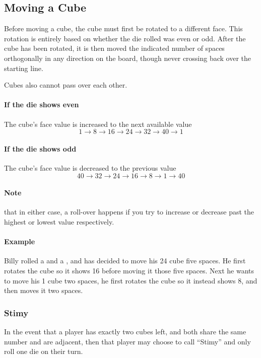 \subsection{Moving a Cube}
Before moving a cube, the cube must first be rotated to a different face.
This rotation is entirely based on whether the die rolled was even or odd.
After the cube has been rotated, it is then moved the indicated number of spaces orthogonally in any direction on the board, though never crossing back over the starting line.

Cubes also cannot pass over each other.

\paragraph{If the die shows even} The cube's face value is increased to the next available value
$$1 \to 8 \to 16 \to 24 \to 32 \to 40 \to 1$$
\paragraph{If the die shows odd} The cube's face value is decreased to the previous value
$$40 \to 32 \to 24 \to 16 \to 8 \to 1 \to 40$$
\paragraph{Note} that in either case, a roll-over happens if you try to increase or decrease past the highest or lowest value respectively.

\paragraph{Example} Billy rolled a  and a , and has decided to move his 24 cube five spaces. He first rotates the cube so it shows 16 before moving it those five spaces. Next he wants to move his 1 cube two spaces, he first rotates the cube so it instead shows 8, and then moves it two spaces.

\subsubsection{Stimy}
In the event that a player has exactly two cubes left, and both share the same number and are adjacent, then that player may choose to call ``Stimy'' and only roll one die on their turn.
